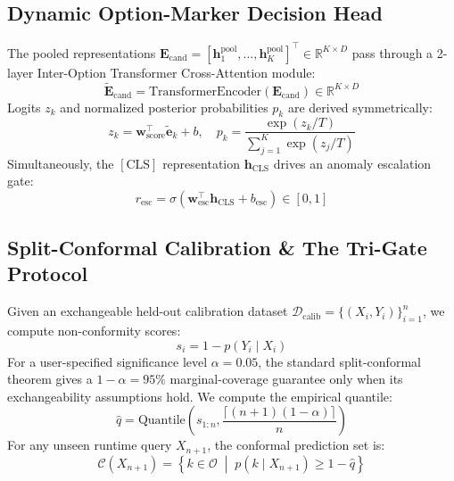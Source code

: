 \documentclass[11pt,a4paper]{article}
\begin{document}
\subsection{Dynamic Option-Marker Decision Head}
The pooled representations $\mathbf{E}_{\text{cand}} = [\mathbf{h}_1^{\text{pool}}, \dots, \mathbf{h}_K^{\text{pool}}]^\top \in \mathbb{R}^{K \times D}$ pass through a 2-layer Inter-Option Transformer Cross-Attention module:
\begin{equation}
\widetilde{\mathbf{E}}_{\text{cand}} = \text{TransformerEncoder}(\mathbf{E}_{\text{cand}}) \in \mathbb{R}^{K \times D}
\end{equation}
Logits $z_k$ and normalized posterior probabilities $p_k$ are derived symmetrically:
\begin{equation}
z_k = \mathbf{w}_{\text{score}}^\top \widetilde{\mathbf{e}}_k + b, \quad p_k = \frac{\exp(z_k / T)}{\sum_{j=1}^K \exp(z_j / T)}
\end{equation}
Simultaneously, the $[\text{CLS}]$ representation $\mathbf{h}_{\text{CLS}}$ drives an anomaly escalation gate:
\begin{equation}
r_{\text{esc}} = \sigma(\mathbf{w}_{\text{esc}}^\top \mathbf{h}_{\text{CLS}} + b_{\text{esc}}) \in [0, 1]
\end{equation}

\subsection{Split-Conformal Calibration \& The Tri-Gate Protocol}
Given an exchangeable held-out calibration dataset $\mathcal{D}_{\text{calib}} = \{(X_i, Y_i)\}_{i=1}^n$, we compute non-conformity scores:
\begin{equation}
s_i = 1 - p(Y_i \mid X_i)
\end{equation}
For a user-specified significance level $\alpha = 0.05$, the standard split-conformal theorem gives a $1-\alpha=95\%$ marginal-coverage guarantee only when its exchangeability assumptions hold. We compute the empirical quantile:
\begin{equation}
\hat{q} = \text{Quantile}\left( s_{1:n}, \frac{\lceil (n+1)(1-\alpha) \rceil}{n} \right)
\end{equation}
For any unseen runtime query $X_{n+1}$, the conformal prediction set is:
\begin{equation}
\mathcal{C}(X_{n+1}) = \left\{ k \in \mathcal{O} \;\middle|\; p(k \mid X_{n+1}) \ge 1 - \hat{q} \right\}
\end{equation}
\end{document}
